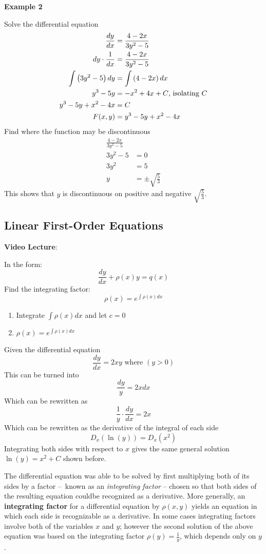 \documentclass{article}
\begin{document}
\hr

\textbf{Example 2}

Solve the differential equation
\begin{align*}
    \frac{dy}{dx} & = \frac{4 - 2x}{3y^2 - 5} \\
    dy \cdot \frac{1}{dx} & = \frac{4 - 2x}{3y^2 - 5} \\
    \int \left( 3y^2 - 5 \right) dy & = \int \left( 4 - 2x \right) dx \\
    y^3 - 5y & = -x^2 + 4x + C \text{, isolating $ C $} \\
    y^3 - 5y + x^2 - 4x & = C \\
    F(x,y) & = y^3 - 5y + x^2 - 4x
\end{align*}
Find where the function may be discontinuous
\begin{align*}
    \frac{4 - 2x}{3y^2 - 5} \\
    3y^2 - 5 & = 0 \\
    3y^2 & = 5 \\
    y & = \pm \sqrt{\frac{5}{3}}
\end{align*}
This shows that $ y $ is discontinuous on positive and negative $ \sqrt{\frac{5}{3}} $.

\subsection{Linear First-Order Equations}

\textbf{Video Lecture}:

In the form:
$$ \frac{dy}{dx} + \rho(x)y = q(x) $$
Find the integrating factor:
$$ \rho(x) = e^{\int \rho(x)dx} $$
\begin{enumerate}
    \item Integrate $ \int \rho(x)dx $ and let $ c = 0 $
    \item $ \rho(x) = e^{\int \rho(x)dx} $
\end{enumerate}

\hr

Given the differential equation
$$ \frac{dy}{dx} = 2xy \text{ where } (y > 0) $$
This can be turned into
$$ \frac{dy}{y} = 2xdx $$
Which can be rewritten as
$$ \frac{1}{y} \cdot \frac{dy}{dx} = 2x $$
Which can be rewritten as the derivative of the integral of each side
$$ D_x(\ln(y)) = D_x(x^2) $$
Integrating both sides with respect to $ x $ gives the same general solution $ \ln(y) = x^2 + C $ shown before.

The differential equation was able to be solved by first multiplying both of its sides by a factor – known as an \textit{integrating factor} – chosen so that both sides of the resulting equation couldbe recognized as a derivative. More generally, an \textbf{integrating factor} for a differential equation by $ \rho(x,y) $ yields an equation in which each side is recognizable as a derivative. In some cases integrating factors involve both of the variables $ x $ and $ y $; however the second solution of the above equation was based on the integrating factor $ \rho(y) = \frac{1}{y} $, which depends only on $ y $.
\end{document}
